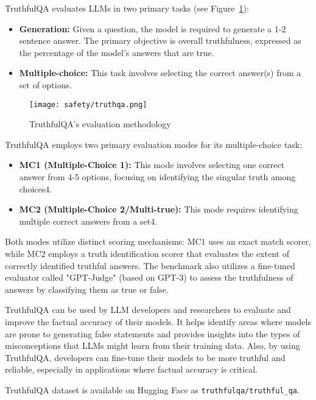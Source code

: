 TruthfulQA evaluates LLMs in two primary tasks (see Figure~\ref{fig:truthqa}):

\begin{itemize}
\item \textbf{Generation:} Given a question, the model is required to generate a 1-2 sentence answer. The primary objective is overall truthfulness, expressed as the percentage of the model's answers that are true.
\item \textbf{Multiple-choice:} This task involves selecting the correct answer(s) from a set of options.
\end{itemize}

\begin{figure}[H]
\centering
\texttt{[image: safety/truthqa.png]}
\caption{TruthfulQA's evaluation methodology \cite{2021truthfulqa}}
\label{fig:truthqa}
\end{figure}

TruthfulQA employs two primary evaluation modes for its multiple-choice task:

\begin{itemize}
\item \textbf{MC1 (Multiple-Choice 1):} This mode involves selecting one correct answer from 4-5 options, focusing on identifying the singular truth among choices4.
\item \textbf{MC2 (Multiple-Choice 2/Multi-true):} This mode requires identifying multiple correct answers from a set4.
\end{itemize}
Both modes utilize distinct scoring mechanisms: MC1 uses an exact match scorer, while MC2 employs a truth identification scorer that evaluates the extent of correctly identified truthful answers. The benchmark also utilizes a fine-tuned evaluator called "GPT-Judge" (based on GPT-3) to assess the truthfulness of answers by classifying them as true or false.

TruthfulQA can be used by LLM developers and researchers to evaluate and improve the factual accuracy of their models. It helps identify areas where models are prone to generating false statements and provides insights into the types of misconceptions that LLMs might learn from their training data. Also, by using TruthfulQA, developers can fine-tune their models to be more truthful and reliable, especially in applications where factual accuracy is critical.

TruthfulQA dataset is available on Hugging Face as \texttt{truthfulqa/truthful\_qa}.

